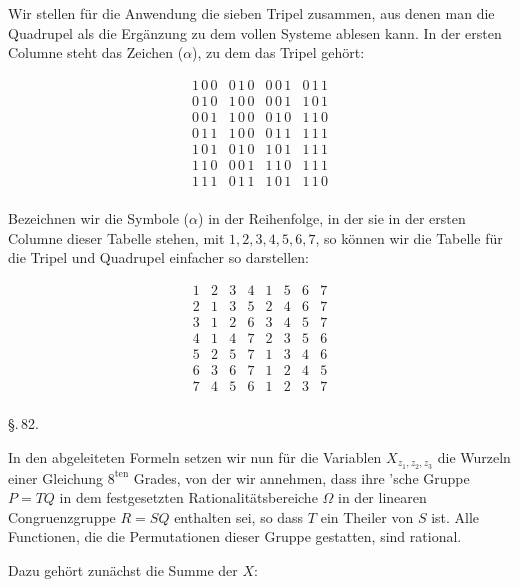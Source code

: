 
Wir stellen für die Anwendung die sieben Tripel zusammen, aus denen man die Quadrupel als die Ergänzung zu dem vollen Systeme ablesen kann. In der ersten Columne steht das Zeichen ($\alpha$), zu dem das Tripel gehört:

\[
\begin{array}{c||ccc|}
1\,0\,0 & 0\,1\,0 & 0\,0\,1 & 0\,1\,1 \\
0\,1\,0 & 1\,0\,0 & 0\,0\,1 & 1\,0\,1 \\
0\,0\,1 & 1\,0\,0 & 0\,1\,0 & 1\,1\,0 \\
0\,1\,1 & 1\,0\,0 & 0\,1\,1 & 1\,1\,1 \\
1\,0\,1 & 0\,1\,0 & 1\,0\,1 & 1\,1\,1 \\
1\,1\,0 & 0\,0\,1 & 1\,1\,0 & 1\,1\,1 \\
1\,1\,1 & 0\,1\,1 & 1\,0\,1 & 1\,1\,0 \\
\end{array}
\]

Bezeichnen wir die Symbole ($\alpha$) in der Reihenfolge, in der sie in der ersten Columne dieser Tabelle stehen, mit $1, 2, 3, 4, 5, 6, 7$, so können wir die Tabelle für die Tripel und Quadrupel einfacher so darstellen:

\[
\begin{array}{c|ccc|cccc}
1 & 2 & 3 & 4 & 1 & 5 & 6 & 7 \\
2 & 1 & 3 & 5 & 2 & 4 & 6 & 7 \\
3 & 1 & 2 & 6 & 3 & 4 & 5 & 7 \\
4 & 1 & 4 & 7 & 2 & 3 & 5 & 6 \\
5 & 2 & 5 & 7 & 1 & 3 & 4 & 6 \\
6 & 3 & 6 & 7 & 1 & 2 & 4 & 5 \\
7 & 4 & 5 & 6 & 1 & 2 & 3 & 7 \\
\end{array}
\]

\begin{center}
\S.\,82.

\end{center}

In den abgeleiteten Formeln setzen wir nun für die Variablen $X_{z_1,z_2,z_3}$ die Wurzeln einer Gleichung $8^{\mathrm{ten}}$ Grades, von der wir annehmen, dass ihre 'sche Gruppe $P = TQ$ in dem festgesetzten Rationalitätsbereiche $\Omega$ in der linearen Congruenzgruppe $R = SQ$ enthalten sei, so dass $T$ ein Theiler von $S$ ist. Alle Functionen, die die Permutationen dieser Gruppe gestatten, sind rational.

Dazu gehört zunächst die Summe der $X$:

